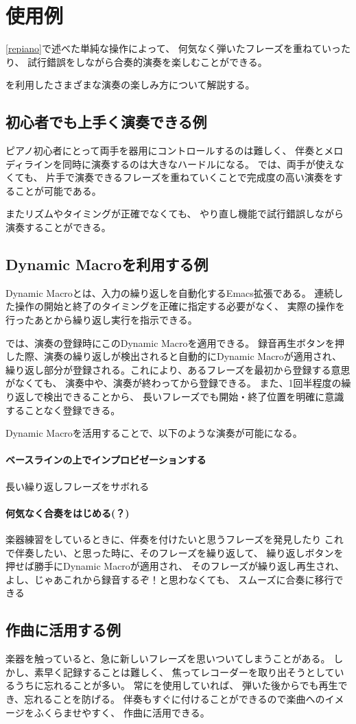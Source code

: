 \section{{\system}使用例}

\ref{repiano}で述べた単純な操作によって、
何気なく弾いたフレーズを重ねていったり、
試行錯誤をしながら合奏的演奏を楽しむことができる。

{\system}を利用したさまざまな演奏の楽しみ方について解説する。

\subsection{初心者でも上手く演奏できる例}
ピアノ初心者にとって両手を器用にコントロールするのは難しく、
伴奏とメロディラインを同時に演奏するのは大きなハードルになる。
{\system}では、両手が使えなくても、
片手で演奏できるフレーズを重ねていくことで完成度の高い演奏をすることが可能である。

またリズムやタイミングが正確でなくても、
やり直し機能で試行錯誤しながら演奏することができる。


\subsection{Dynamic Macroを利用する例}
Dynamic Macroとは、入力の繰り返しを自動化するEmacs拡張である。
連続した操作の開始と終了のタイミングを正確に指定する必要がなく、
実際の操作を行ったあとから繰り返し実行を指示できる。

{\system}では、演奏の登録時にこのDynamic Macroを適用できる。
録音再生ボタンを押した際、演奏の繰り返しが検出されると自動的にDynamic Macroが適用され、
繰り返し部分が登録される。これにより、あるフレーズを最初から登録する意思がなくても、
演奏中や、演奏が終わってから登録できる。
また、1回半程度の繰り返しで検出できることから、
長いフレーズでも開始・終了位置を明確に意識することなく登録できる。

Dynamic Macroを活用することで、以下のような演奏が可能になる。

\paragraph*{ベースラインの上でインプロビゼーションする}
長い繰り返しフレーズをサボれる

\paragraph*{何気なく合奏をはじめる(？)}
楽器練習をしているときに、伴奏を付けたいと思うフレーズを発見したり
これで伴奏したい、と思った時に、そのフレーズを繰り返して、
繰り返しボタンを押せば勝手にDynamic Macroが適用され、
そのフレーズが繰り返し再生され、よし、じゃあこれから録音するぞ！と思わなくても、
スムーズに合奏に移行できる

\subsection{作曲に活用する例}
楽器を触っていると、急に新しいフレーズを思いついてしまうことがある。
しかし、素早く記録することは難しく、
焦ってレコーダーを取り出そうとしているうちに忘れることが多い。
常に{\system}を使用していれば、
弾いた後からでも再生でき、忘れることを防げる。
伴奏もすぐに付けることができるので楽曲へのイメージをふくらませやすく、
作曲に活用できる。
